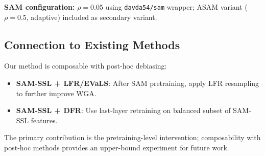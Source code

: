 \textbf{SAM configuration:} $\rho=0.05$ using \texttt{davda54/sam} wrapper; ASAM variant ($\rho=0.5$, adaptive) included as secondary variant.

\subsection{Connection to Existing Methods}

Our method is composable with post-hoc debiasing:
\begin{itemize}
    \item \textbf{SAM-SSL + LFR/EVaLS}: After SAM pretraining, apply LFR resampling to further improve WGA.
    \item \textbf{SAM-SSL + DFR}: Use last-layer retraining on balanced subset of SAM-SSL features.
\end{itemize}

The primary contribution is the pretraining-level intervention; composability with post-hoc methods provides an upper-bound experiment for future work.

